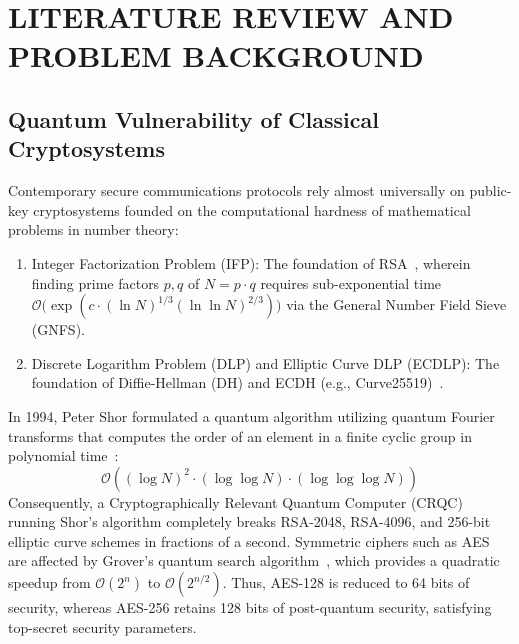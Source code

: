 
\chapter{LITERATURE REVIEW AND PROBLEM BACKGROUND}
\label{chap:literature_review}

\section{Quantum Vulnerability of Classical Cryptosystems}
\label{sec:quantum_vulnerability}

Contemporary secure communications protocols rely almost universally on public-key cryptosystems founded on the computational hardness of mathematical problems in number theory:
\begin{enumerate}[label=(\alph*)]
    \item Integer Factorization Problem (IFP): The foundation of RSA~\cite{alagic2022nist}, wherein finding prime factors $p, q$ of $N = p \cdot q$ requires sub-exponential time $\mathcal{O}\big(\exp(c \cdot (\ln N)^{1/3} (\ln \ln N)^{2/3})\big)$ via the General Number Field Sieve (GNFS).
    \item Discrete Logarithm Problem (DLP) and Elliptic Curve DLP (ECDLP): The foundation of Diffie-Hellman (DH) and ECDH (e.g., Curve25519)~\cite{stallings2022cryptography}.
\end{enumerate}

In 1994, Peter Shor formulated a quantum algorithm utilizing quantum Fourier transforms that computes the order of an element in a finite cyclic group in polynomial time~\cite{mavroeidis2022impact}:
\begin{equation}
\mathcal{O}\left( (\log N)^2 \cdot (\log \log N) \cdot (\log \log \log N) \right)
\end{equation}
Consequently, a Cryptographically Relevant Quantum Computer (CRQC) running Shor's algorithm completely breaks RSA-2048, RSA-4096, and 256-bit elliptic curve schemes in fractions of a second. Symmetric ciphers such as AES are affected by Grover's quantum search algorithm~\cite{mavroeidis2022impact,cisa2023postquantum}, which provides a quadratic speedup from $\mathcal{O}(2^n)$ to $\mathcal{O}(2^{n/2})$. Thus, AES-128 is reduced to 64 bits of security, whereas AES-256 retains 128 bits of post-quantum security, satisfying top-secret security parameters.

